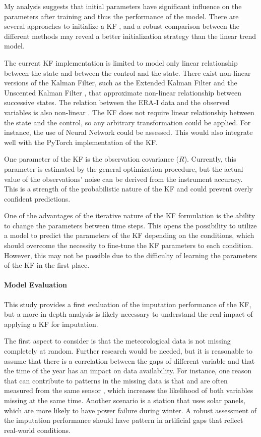 \documentclass{article}
\begin{document}
My analysis suggests that initial parameters have significant influence on the parameters after training and thus the performance of the model. There are several approaches to initialize a KF \cite{durbin_time_2012}, and a robust comparison between the different methods may reveal a better initialization strategy than the linear trend model.  

The current KF implementation is limited to model only linear relationship between the state and between the control and the state. There exist non-linear versions of the Kalman Filter, such as the Extended Kalman Filter and the Unscented Kalman Filter \cite{dan_simon_optimal_2006}, that approximate non-linear relationship between successive states.
The relation between the ERA-I data and the observed variables is also non-linear \cite{vuichard_filling_2015}. The KF does not require linear relationship between the state and the control, so any arbitrary transformation could be applied. For instance, the use of Neural Network could be assessed. This would also integrate well with the \textsf{PyTorch} implementation of the KF.

One parameter of the KF is the observation covariance ($R$). Currently, this parameter is estimated by the general optimization procedure, but the actual value of the observations' noise can be derived from the instrument accuracy. This is a strength of the probabilistic nature of the KF and could prevent overly confident predictions. 

One of the advantages of the iterative nature of the KF formulation is the ability to change the parameters between time steps.
This opens the possibility to utilize a model to predict the parameters of the KF depending on the conditions, which should overcome the necessity to fine-tune the KF parameters to each condition.
However, this may not be possible due to the difficulty of learning the parameters of the KF in the first place.

\paragraph{Model Evaluation} This study provides a first evaluation of the imputation performance of the KF, but a more in-depth analysis is likely necessary to understand the real impact of applying a KF for imputation.

The first aspect to consider is that the meteorological data is not missing completely at random. Further research would be needed, but it is reasonable to assume that there is a correlation between the gaps of different variable and that the time of the year has an impact on data availability. For instance, one reason that can contribute to patterns in the missing data is that  and  are often measured from the same sensor \cite{noauthor_associated_2020, noauthor_specification_nodate}, which increases the likelihood of both variables missing at the same time. Another scenario is a station that uses solar panels, which are more likely to have power failure during winter. A robust assessment of the imputation performance should have pattern in artificial gaps that reflect real-world conditions.
\end{document}
